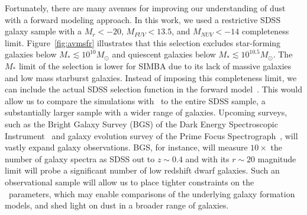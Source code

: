 Fortunately, there are many avenues for improving our understanding of dust
with a forward modeling approach. 
In this work, we used a restrictive SDSS galaxy sample with a $M_r < -20$,
$M_{FUV} < 13.5$, and $M_{NUV} < -14$ completeness limit. 
Figure~\ref{fig:avmsfr} illustrates that this selection excludes star-forming
galaxies below $M_* \lesssim 10^{10}M_\odot$ and quiescent
galaxies below $M_* \lesssim 10^{10.5}M_\odot$. 
The $M_*$ limit of the selection is lower for SIMBA due to its lack of massive
galaxies and low mass starburst galaxies. 
Instead of imposing this completeness limit, we can include the actual SDSS
selection function in the forward 
model~\citep[\eg~][]{dickey2020}. 
This would allow us to compare the simulations with \eda~to the entire SDSS
sample, a substantially larger sample with a wider range of galaxies. 
Upcoming surveys, such as the Bright Galaxy Survey (BGS) of the Dark Energy
Spectroscopic Instrument~\citep[DESI;][]{desicollaboration2016, ruiz-macias2020} 
and galaxy evolution survey of the Prime Focus
Spectrograph~\citep[PFS;][]{takada2014,tamura2016}, will vastly expand galaxy
observations. 
BGS, for instance, will measure $10\times$ the number of galaxy spectra as
SDSS out to $z\sim0.4$  and with its $r\sim20$ magnitude limit will probe
a significant number of low redshift dwarf galaxies. 
Such an observational sample will allow us to place tighter constraints on
the \eda~parameters, which may enable comparisons of the underlying galaxy
formation models, and shed light on dust in a broader range of galaxies.
    
